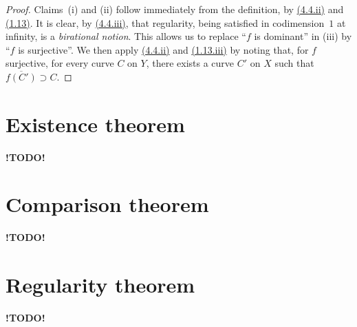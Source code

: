 \documentclass{report}
\newcommand{\todo}{\textbf{ !TODO! }}
\newcommand{\oldpage}[1]{\marginpar{\footnotesize$\Big\vert$ \textit{p.~#1}}}
\begin{document}
\begin{proof}
  Claims~(i) and (ii) follow immediately from the definition, by \hyperref[II.4.4]{(4.4.ii)}
\oldpage{91}
  and \hyperref[II.1.13]{(1.13)}.
  It is clear, by \hyperref[II.4.4]{(4.4.iii)}, that regularity, being satisfied in codimension~$1$ at infinity, is a \emph{birational notion}.
  This allows us to replace ``$f$ is dominant'' in (iii) by ``$f$ is surjective''.
  We then apply \hyperref[II.4.4]{(4.4.ii)} and \hyperref[II.1.13]{(1.13.iii)} by noting that, for $f$ surjective, for every curve $C$ on $Y$, there exists a curve $C'$ on $X$ such that $\overline{f(C')}\supset C$.
\end{proof}



\section{Existence theorem}
\label{II.5}










\todo










\section{Comparison theorem}
\label{II.6}










\todo










\section{Regularity theorem}
\label{II.7}










\todo
\end{document}
